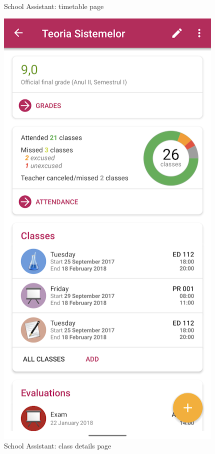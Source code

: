 \begin{figure}[!h]
\begin{minipage}[b]{0.39\textwidth}
                    \caption{School Assistant: timetable page}
                    \label{2:fig:school_assistant_timetable}
                \end{minipage}
                \hfill
                \begin{minipage}[b]{0.39\textwidth}
                    \captionsetup{justification=centering}
                    \includegraphics[width=\textwidth]{figures/uni_apps/features/school_assistant_class.png}
                    \caption{School Assistant: class details page}
                    \label{2:fig:school_assistant_class}
                \end{minipage}
                
        \end{figure}  
    
